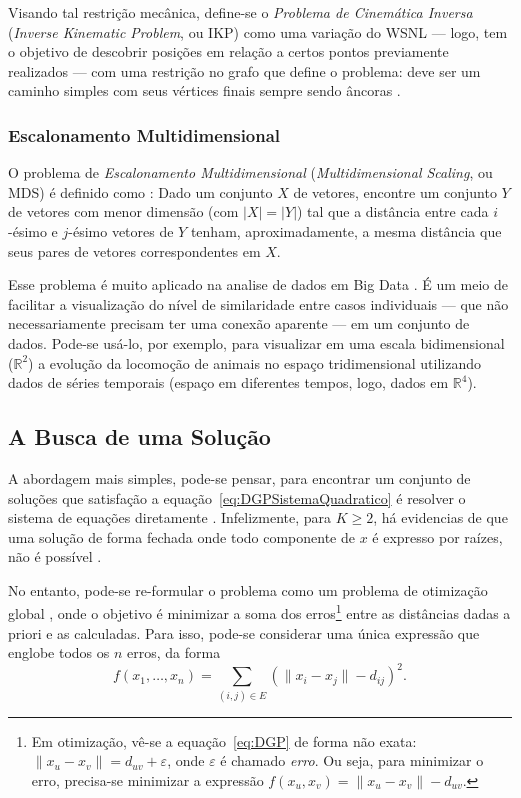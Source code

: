 Visando tal restrição mecânica, define-se o \textit{Problema de Cinemática Inversa} (\textit{Inverse Kinematic Problem}, ou IKP) como uma variação do WSNL --- logo, tem o objetivo de descobrir posições em relação a certos pontos previamente realizados --- com uma restrição no grafo que define o problema: deve ser um caminho simples com seus vértices finais sempre sendo âncoras \cite{carlileGDandAplications}.

\subsubsection{Escalonamento Multidimensional}

O problema de \textit{Escalonamento Multidimensional} (\textit{Multidimensional Scaling}, ou MDS)
é definido como \cite{carlileGDandAplications}: Dado um conjunto $X$ de vetores, encontre um conjunto $Y$ de vetores com menor dimensão (com $|X| = |Y|$) tal que a distância entre cada $i$-ésimo e $j$-ésimo vetores de $Y$ tenham, aproximadamente, a mesma distância que seus pares de vetores correspondentes em $X$.

Esse problema é muito aplicado na analise de dados em Big Data \cite{libertiEDG}. É um meio de facilitar a visualização do nível de similaridade entre casos individuais --- que não necessariamente precisam ter uma conexão aparente --- em um conjunto de dados. Pode-se usá-lo, por exemplo, para visualizar em uma escala bidimensional ($\mathbb{R}^2$) a evolução da locomoção de animais no espaço tridimensional utilizando dados de séries temporais (espaço em diferentes tempos, logo, dados em $\mathbb{R}^4$).

\subsection{A Busca de uma Solução}

A abordagem mais simples, pode-se pensar, para encontrar um conjunto de soluções que satisfação a equação~\ref{eq:DGPSistemaQuadratico} é resolver o sistema de equações diretamente \cite{carlileBook31Coloquio}. Infelizmente, para $K \geq 2$, há evidencias de que uma solução de forma fechada onde todo componente de $x$ é expresso por raízes, não é possível \cite{libertiEDG}. 

No entanto, pode-se re-formular o problema como um problema de otimização global \cite{libertiEDG}, onde o objetivo é minimizar a soma dos erros\footnote{Em otimização, vê-se a equação~\ref{eq:DGP} de forma não exata: $\lVert x_u - x_v \rVert = d_{uv} + \varepsilon$, onde $\varepsilon$ é chamado \textit{erro}. Ou seja, para minimizar o erro, precisa-se minimizar a expressão $f(x_u,x_v) = \lVert x_u - x_v \rVert - d_{uv}$.} entre as distâncias dadas a priori e as calculadas. Para isso, pode-se considerar uma única expressão que englobe todos os $n$ erros, da forma
\begin{equation}
	f(x_1,\dots,x_n) = \sum_{(i,j)\in E} \left(\lVert x_i - x_j \rVert - d_{ij}\right)^2.
\end{equation}

